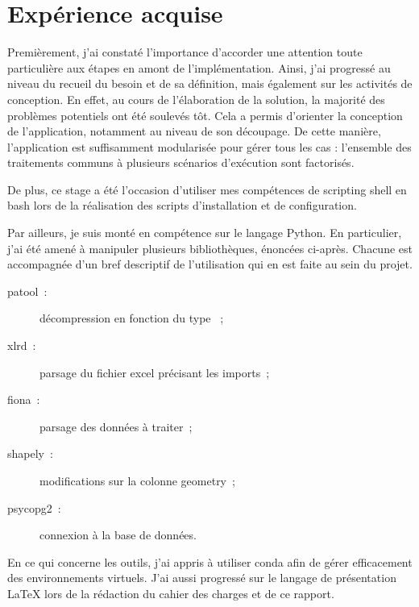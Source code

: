  \section*{Expérience acquise}

Premièrement, j'ai constaté l'importance d'accorder une attention toute particulière aux étapes en amont de l'implémentation. Ainsi, j'ai progressé au niveau du recueil du besoin et de sa définition, mais également sur les activités de conception. En effet, au cours de l'élaboration de la solution, la majorité des problèmes potentiels ont été soulevés tôt. Cela a permis d'orienter la conception de l'application, notamment au niveau de son découpage. De cette manière, l'application est suffisamment modularisée pour gérer tous les cas : l'ensemble des traitements communs à plusieurs scénarios d'exécution sont factorisés.

De plus, ce stage a été l'occasion d'utiliser mes compétences de scripting shell en bash lors de la réalisation des scripts d'installation et de configuration.

Par ailleurs, je suis monté en compétence sur le langage Python. En particulier, j'ai été amené à manipuler plusieurs bibliothèques, énoncées ci-après. Chacune est accompagnée d'un bref descriptif de l'utilisation qui en est faite au sein du projet.

\begin{description}
  \item[patool~:] décompression en fonction du type ~;
  \item[xlrd~:] parsage du fichier excel précisant les imports~;
  \item[fiona~:] parsage des données à traiter~;
  \item[shapely~:] modifications sur la colonne geometry~;
  \item[psycopg2~:] connexion à la base de données.
\end{description}

En ce qui concerne les outils, j'ai appris à utiliser conda afin de gérer efficacement des environnements virtuels. J'ai aussi progressé sur le langage de présentation LaTeX lors de la rédaction du cahier des charges et de ce rapport.

\clearpage
{}
